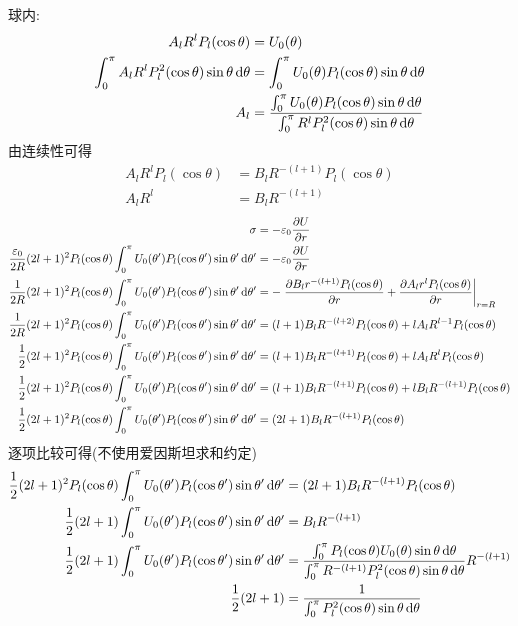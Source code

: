 球内:
\begin{align*}
    A_{l} R^lP_{l}(\cos\theta)
&=U_0(\theta)\\
    \int_{0}^{\pi}A_{l} R^lP_{l}^2(\cos\theta)\sin\theta\dif\theta
&=\int_{0}^{\pi}U_0(\theta)P_{l}(\cos\theta)\sin\theta\dif\theta\\
A_l&=\frac{\int_{0}^{\pi}U_0(\theta)P_{l}(\cos\theta)\sin\theta\dif\theta}{\int_{0}^{\pi} R^lP_{l}^2(\cos\theta)\sin\theta\dif\theta}
\end{align*}
由连续性可得
\begin{align*}
    A_{l} R^lP_{l}(\cos\theta)&=B_{l} R^{-(l+1)}
P_{l}(\cos\theta)\\
    A_{l} R^l&=B_{l} R^{-(l+1)}
\end{align*}
\begin{align*}
    \sigma&=-\varepsilon_0\frac{\partial U}{\partial r}\\
    \frac{\varepsilon_0}{2R}(2l+1)^2P_l(\cos\theta)\int_{0}^{\pi}U_0(\theta')P_l(\cos\theta')\sin\theta'\dif\theta'&=-\varepsilon_0\frac{\partial U}{\partial r}\\
        \frac{1}{2R}(2l+1)^2P_l(\cos\theta)\int_{0}^{\pi}U_0(\theta')P_l(\cos\theta')\sin\theta'\dif\theta'
        &=-\left.\frac{\partial B_{l} r^{-(l+1)}
P_{l}(\cos\theta)}{\partial r}+\frac{\partial A_{l} r^{l}
P_{l}(\cos\theta)}{\partial r}\right|_{r=R}\\
        \frac{1}{2R}(2l+1)^2P_l(\cos\theta)\int_{0}^{\pi}U_0(\theta')P_l(\cos\theta')\sin\theta'\dif\theta'&=(l+1)B_{l} R^{-(l+2)}
P_{l}(\cos\theta)
+lA_lR^{l-1}P_{l}(\cos\theta)\\
        \frac{1}{2}(2l+1)^2P_l(\cos\theta)\int_{0}^{\pi}U_0(\theta')P_l(\cos\theta')\sin\theta'\dif\theta'&=(l+1)B_{l} R^{-(l+1)}
P_{l}(\cos\theta)
+lA_lR^lP_{l}(\cos\theta)\\
        \frac{1}{2}(2l+1)^2P_l(\cos\theta)\int_{0}^{\pi}U_0(\theta')P_l(\cos\theta')\sin\theta'\dif\theta'&=(l+1)B_{l} R^{-(l+1)}
P_{l}(\cos\theta)
+lB_{l} R^{-(l+1)}P_{l}(\cos\theta)\\
        \frac{1}{2}(2l+1)^2P_l(\cos\theta)\int_{0}^{\pi}U_0(\theta')P_l(\cos\theta')\sin\theta'\dif\theta'&=(2l+1)B_{l} R^{-(l+1)}
P_{l}(\cos\theta)
\end{align*}
逐项比较可得(不使用爱因斯坦求和约定)
\begin{align*}
\frac{1}{2}(2l+1)^2P_l(\cos\theta)\int_{0}^{\pi}U_0(\theta')P_l(\cos\theta')\sin\theta'\dif\theta'&=(2l+1)B_{l} R^{-(l+1)}
P_{l}(\cos\theta)\\
\frac{1}{2}(2l+1)\int_{0}^{\pi}U_0(\theta')P_l(\cos\theta')\sin\theta'\dif\theta'&=B_{l} R^{-(l+1)}\\
\frac{1}{2}(2l+1)\int_{0}^{\pi}U_0(\theta')P_l(\cos\theta')\sin\theta'\dif\theta'&=\dfrac{\int_{0}^{\pi}P_{l}(\cos\theta)U_0(\theta)\sin\theta\dif\theta}{\int_{0}^{\pi} R^{-(l+1)}P_{l}^2(\cos\theta)\sin\theta\dif\theta} R^{-(l+1)}\\
\frac{1}{2}(2l+1)&=\dfrac{1}{\int_{0}^{\pi} P_{l}^2(\cos\theta)\sin\theta\dif\theta} 
\end{align*}

